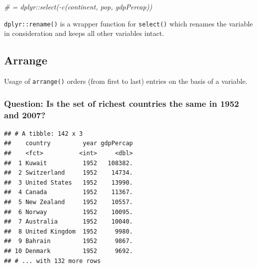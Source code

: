 \documentclass[11pt,]{article}
\newenvironment{Shaded}{\begin{snugshade}}{\end{snugshade}}
\newcommand{\KeywordTok}[1]{\textcolor[rgb]{0.13,0.29,0.53}{\textbf{#1}}}
\newcommand{\StringTok}[1]{\textcolor[rgb]{0.31,0.60,0.02}{#1}}
\newcommand{\CommentTok}[1]{\textcolor[rgb]{0.56,0.35,0.01}{\textit{#1}}}
\newcommand{\OperatorTok}[1]{\textcolor[rgb]{0.81,0.36,0.00}{\textbf{#1}}}
\newcommand{\NormalTok}[1]{#1}
\begin{document}
\begin{Shaded}
\begin{Highlighting}[]
\CommentTok{# = dplyr::select(-c(continent, pop, gdpPercap))}
\end{Highlighting}
\end{Shaded}

\texttt{dplyr::rename()} is a wrapper function for \texttt{select()}
which renames the variable in consideration and keeps all other
variables intact.

\subsection{Arrange}\label{arrange}

Usage of \texttt{arrange()} orders (from first to last) entries on the
basis of a variable.

\subsubsection{Question: Is the set of richest countries the same in
1952 and
2007?}\label{question-is-the-set-of-richest-countries-the-same-in-1952-and-2007}

\begin{Shaded}
\end{Shaded}

\begin{verbatim}
## # A tibble: 142 x 3
##    country         year gdpPercap
##    <fct>          <int>     <dbl>
##  1 Kuwait          1952   108382.
##  2 Switzerland     1952    14734.
##  3 United States   1952    13990.
##  4 Canada          1952    11367.
##  5 New Zealand     1952    10557.
##  6 Norway          1952    10095.
##  7 Australia       1952    10040.
##  8 United Kingdom  1952     9980.
##  9 Bahrain         1952     9867.
## 10 Denmark         1952     9692.
## # ... with 132 more rows
\end{verbatim}

\begin{Shaded}
\end{Shaded}
\end{document}
